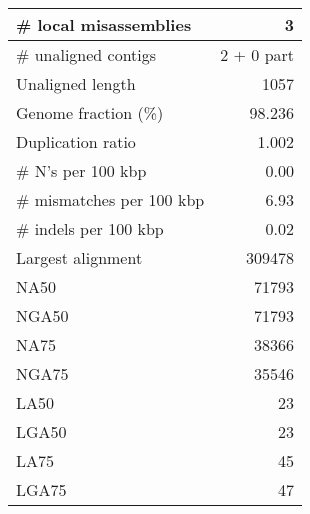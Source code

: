 \documentclass[12pt,a4paper]{article}
\begin{document}
\begin{table}[ht]
\begin{center}
\begin{tabular}{|l*{1}{|r}|}
\# local misassemblies & 3 \\ \hline
\# unaligned contigs & 2 + 0 part \\ \hline
Unaligned length & 1057 \\ \hline
Genome fraction (\%) & 98.236 \\ \hline
Duplication ratio & 1.002 \\ \hline
\# N's per 100 kbp & 0.00 \\ \hline
\# mismatches per 100 kbp & 6.93 \\ \hline
\# indels per 100 kbp & 0.02 \\ \hline
Largest alignment & 309478 \\ \hline
NA50 & 71793 \\ \hline
NGA50 & 71793 \\ \hline
NA75 & 38366 \\ \hline
NGA75 & 35546 \\ \hline
LA50 & 23 \\ \hline
LGA50 & 23 \\ \hline
LA75 & 45 \\ \hline
LGA75 & 47 \\ \hline
\end{tabular}
\end{center}
\end{table}
\end{document}
